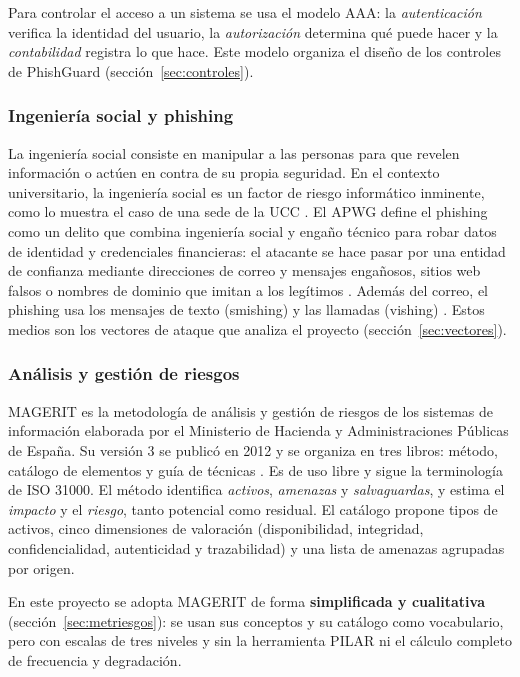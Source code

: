 \documentclass[journal,onecolumn,12pt,draftclsnofoot]{IEEEtran}
\begin{document}
Para controlar el acceso a un sistema se usa el modelo AAA: la \emph{autenticación} verifica la identidad del usuario, la \emph{autorización} determina qué puede hacer y la \emph{contabilidad} registra lo que hace. Este modelo organiza el diseño de los controles de PhishGuard (sección~\ref{sec:controles}).

\subsubsection{Ingeniería social y phishing}

La ingeniería social consiste en manipular a las personas para que revelen información o actúen en contra de su propia seguridad. En el contexto universitario, la ingeniería social es un factor de riesgo informático inminente, como lo muestra el caso de una sede de la UCC \cite{bermudez}. El APWG define el phishing como un delito que combina ingeniería social y engaño técnico para robar datos de identidad y credenciales financieras: el atacante se hace pasar por una entidad de confianza mediante direcciones de correo y mensajes engañosos, sitios web falsos o nombres de dominio que imitan a los legítimos \cite{apwg-q2}. Además del correo, el phishing usa los mensajes de texto (smishing) y las llamadas (vishing) \cite{yeboah}. Estos medios son los vectores de ataque que analiza el proyecto (sección~\ref{sec:vectores}).

\subsubsection{Análisis y gestión de riesgos}

MAGERIT es la metodología de análisis y gestión de riesgos de los sistemas de información elaborada por el Ministerio de Hacienda y Administraciones Públicas de España. Su versión 3 se publicó en 2012 y se organiza en tres libros: método, catálogo de elementos y guía de técnicas \cite{magerit}. Es de uso libre y sigue la terminología de ISO 31000. El método identifica \emph{activos}, \emph{amenazas} y \emph{salvaguardas}, y estima el \emph{impacto} y el \emph{riesgo}, tanto potencial como residual. El catálogo propone tipos de activos, cinco dimensiones de valoración (disponibilidad, integridad, confidencialidad, autenticidad y trazabilidad) y una lista de amenazas agrupadas por origen.

En este proyecto se adopta MAGERIT de forma \textbf{simplificada y cualitativa} (sección~\ref{sec:metriesgos}): se usan sus conceptos y su catálogo como vocabulario, pero con escalas de tres niveles y sin la herramienta PILAR ni el cálculo completo de frecuencia y degradación.
\end{document}
